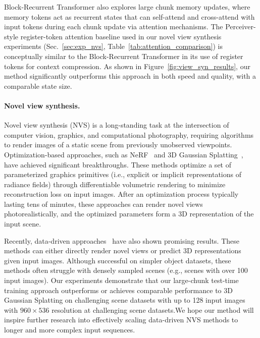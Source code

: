 \documentclass{article}
\begin{document}
Block-Recurrent Transformer \cite{hutchins2022blockrecurrent} also explores large chunk memory updates, where memory tokens act as recurrent states that can self-attend and cross-attend with input tokens during each chunk update via attention mechanisms.  The Perceiver-style register-token attention baseline used in our novel view synthesis experiments (Sec.~\ref{sec:exp_nvs}, Table~\ref{tab:attention_comparison}) is conceptually similar to the Block-Recurrent Transformer in its use of register tokens for context compression. As shown in Figure~\ref{fig:view_syn_results}, our method significantly outperforms this approach in both speed and quality, with a comparable state size.

\paragraph{Novel view synthesis.} Novel view synthesis (NVS) is a long-standing task at the intersection of computer vision, graphics, and computational photography, requiring algorithms to render images of a static scene from previously unobserved viewpoints. Optimization-based approaches, such as NeRF~\cite{mildenhall2021nerf} and 3D Gaussian Splatting~\cite{kerbl20233d}, have achieved significant breakthroughs.
These methods optimize a set of parameterized graphics primitives (i.e., explicit or implicit representations of radiance fields) through differentiable volumetric rendering to minimize reconstruction loss on input images. After an optimization process typically lasting tens of minutes, these approaches can render novel views photorealistically, and the optimized parameters form a 3D representation of the input scene.

Recently, data-driven approaches~\cite{zhang2024gs, jin2024lvsm, ziwen2024long, liu2023zero} have also shown promising results. These methods can either directly render novel views or predict 3D representations given input images. Although successful on simpler object datasets, these methods often struggle with densely sampled scenes (e.g., scenes with over 100 input images).  Our experiments demonstrate that our large-chunk test-time training approach outperforms or achieves comparable performance to 3D Gaussian Splatting on challenging scene datasets with up to 128 input images with $960\times536$ resolution at challenging scene datasets.We hope our method will inspire further research into effectively scaling data-driven NVS methods to longer and more complex input sequences.
\end{document}
